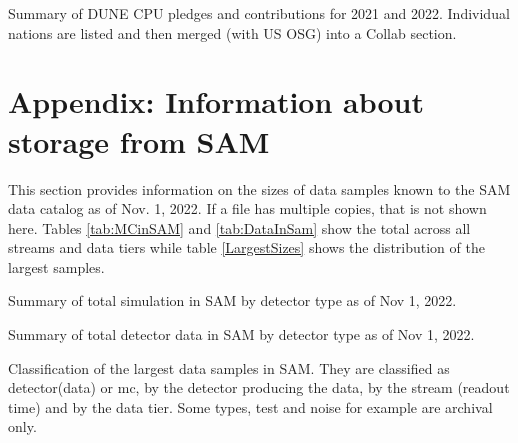 \documentclass[12pt]{article}
\begin{document}
\begin{table}[ht]
\centering{}
\caption{Summary  of DUNE CPU pledges and contributions for 2021 and 2022.  Individual nations are listed and then merged (with US OSG) into a Collab section.  } \label{tab:CPUUsage}
\end{table}

%



\clearpage
\section{Appendix: Information about storage from SAM}\label{storage}

This section provides information on the sizes of data samples known to the SAM data catalog as of Nov. 1, 2022.  If a file has multiple copies, that is not shown here.  Tables \ref{tab:MCinSAM} and \ref{tab:DataInSam} show the total across all streams and data tiers while table \ref{LargestSizes} shows the distribution of the largest samples.  


\begin{table}[ht]
 \centering{}
\caption{Summary  of total simulation in SAM by detector type as of Nov 1, 2022.} 
\label{tab:MCinSAM}
\end{table}

\begin{table}[ht]
 \centering{}
 \caption{Summary  of total detector data in SAM by detector type as of Nov 1, 2022.}
 \label{tab:DataInSam}
\end{table}
\clearpage

\begin{table}[ht]
 \centering{}
\caption{Classification of the largest data samples in SAM.  They are classified as detector(data) or mc, by the detector producing the data, by the stream (readout time) and by the data tier.  Some types, test and noise for example are archival only.  }
 \label{tab:LargestSizes}
\end{table}
\end{document}
